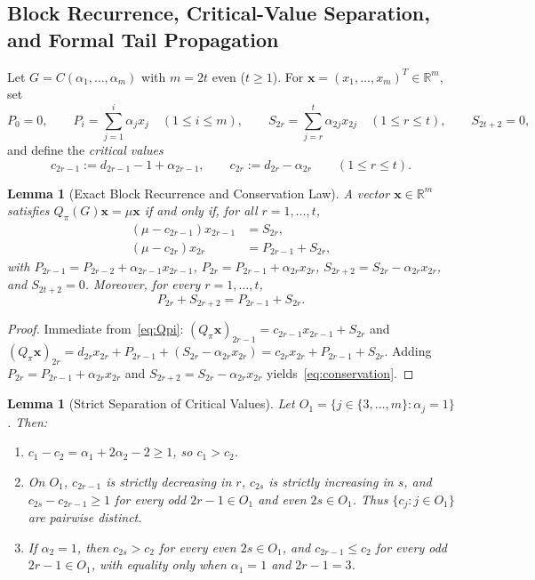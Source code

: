 \documentclass[11pt,a4paper]{article}
\newtheorem{lemma}[theorem]{Lemma}
\theoremstyle{definition}
\begin{document}
\subsection{Block Recurrence, Critical-Value Separation, and Formal Tail Propagation}

Let $G = C(\alpha_1,\dots,\alpha_m)$ with $m = 2t$ even ($t \ge 1$). For $\mathbf{x} = (x_1,\dots,x_m)^T \in \mathbb{R}^m$, set
\[
  P_0 = 0, \qquad P_i = \sum_{j=1}^{i} \alpha_j x_j \quad (1 \le i \le m), \qquad
  S_{2r} = \sum_{j=r}^{t} \alpha_{2j} x_{2j} \quad (1 \le r \le t), \qquad S_{2t+2} = 0,
\]
and define the \emph{critical values}
\begin{equation}\label{eq:crit}
  c_{2r-1} := d_{2r-1} - 1 + \alpha_{2r-1}, \qquad
  c_{2r} := d_{2r} - \alpha_{2r} \qquad (1 \le r \le t).
\end{equation}

\begin{lemma}[Exact Block Recurrence and Conservation Law]\label{lem:recurrence}
  A vector $\mathbf{x} \in \mathbb{R}^m$ satisfies $Q_\pi(G)\mathbf{x} = \mu \mathbf{x}$ if and only if, for all $r = 1,\dots,t$,
  \begin{align}
    (\mu - c_{2r-1}) x_{2r-1} &= S_{2r}, \label{eq:rec_odd}\\
    (\mu - c_{2r}) x_{2r} &= P_{2r-1} + S_{2r}, \label{eq:rec_even}
  \end{align}
  with $P_{2r-1} = P_{2r-2} + \alpha_{2r-1} x_{2r-1}$, $P_{2r} = P_{2r-1} + \alpha_{2r} x_{2r}$, $S_{2r+2} = S_{2r} - \alpha_{2r} x_{2r}$, and $S_{2t+2} = 0$. Moreover, for every $r = 1,\dots,t$,
  \begin{equation}\label{eq:conservation}
    P_{2r} + S_{2r+2} = P_{2r-1} + S_{2r}.
  \end{equation}
\end{lemma}

\begin{proof}
  Immediate from~\eqref{eq:Qpi}: $(Q_\pi \mathbf{x})_{2r-1} = c_{2r-1} x_{2r-1} + S_{2r}$ and $(Q_\pi \mathbf{x})_{2r} = d_{2r} x_{2r} + P_{2r-1} + (S_{2r} - \alpha_{2r} x_{2r}) = c_{2r} x_{2r} + P_{2r-1} + S_{2r}$. Adding $P_{2r} = P_{2r-1} + \alpha_{2r} x_{2r}$ and $S_{2r+2} = S_{2r} - \alpha_{2r} x_{2r}$ yields~\eqref{eq:conservation}.
\end{proof}

\begin{lemma}[Strict Separation of Critical Values]\label{lem:separation}
  Let $O_1 = \{j \in \{3,\dots,m\} : \alpha_j = 1\}$. Then:
  \begin{enumerate}
    \item $c_1 - c_2 = \alpha_1 + 2\alpha_2 - 2 \ge 1$, so $c_1 > c_2$.
    \item On $O_1$, $c_{2r-1}$ is strictly decreasing in $r$, $c_{2s}$ is strictly increasing in $s$, and $c_{2s} - c_{2r-1} \ge 1$ for every odd $2r-1 \in O_1$ and even $2s \in O_1$. Thus $\{c_j : j \in O_1\}$ are pairwise distinct.
    \item If $\alpha_2 = 1$, then $c_{2s} > c_2$ for every even $2s \in O_1$, and $c_{2r-1} \le c_2$ for every odd $2r-1 \in O_1$, with equality only when $\alpha_1 = 1$ and $2r-1 = 3$.
  \end{enumerate}
\end{lemma}
\end{document}
